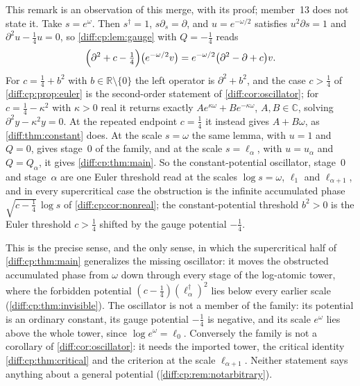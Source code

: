 \documentclass[11pt,letterpaper]{article}
\numberwithin{equation}{section}
\theoremstyle{definition}
\theoremstyle{remark}
\newcommand{\R}{\mathbb R}
\newcommand{\C}{\mathbb C}
\newcommand{\der}{\partial}
\begin{document}
\begin{remark}
\label{diff:cp:rem:oscillator}
This remark is an observation of this merge, with its proof; member~13 does
not state it. Take $s=e^{\omega}$. Then $s^{\dagger}=1$, $s\der_{s}=\der$, and
$u=e^{-\omega/2}$ satisfies $u^{2}\der s=1$ and $\der^{2}u-\frac14u=0$, so
\cref{diff:cp:lem:gauge} with $Q=-\frac14$ reads
\[
 \Bigl(\der^{2}+c-\tfrac14\Bigr)\bigl(e^{-\omega/2}v\bigr)
 =e^{-\omega/2}\bigl(\der^{2}-\der+c\bigr)v .
\]
For $c=\frac14+b^{2}$ with $b\in\R\setminus\{0\}$ the left operator is
$\der^{2}+b^{2}$, and the case $c>\frac14$ of \cref{diff:cp:prop:euler} is the
second-order statement of \cref{diff:cor:oscillator}; for $c=\frac14-\kappa^{2}$
with $\kappa>0$ real it returns exactly
$Ae^{\kappa\omega}+Be^{-\kappa\omega}$, $A,B\in\C$, solving
$\der^{2}y-\kappa^{2}y=0$. At the repeated endpoint
$c=\frac14$ it instead gives $A+B\omega$, as
\cref{diff:thm:constant} does. At the scale $s=\omega$ the same lemma, with
$u=1$ and $Q=0$, gives stage~$0$ of the family, and at the scale
$s=\ell_{\alpha}$, with $u=u_{\alpha}$ and $Q=Q_{\alpha}$, it gives
\cref{diff:cp:thm:main}. So the constant-potential oscillator, stage~$0$ and
stage~$\alpha$ are one Euler threshold read at the scales
$\log s=\omega$, $\ell_{1}$ and $\ell_{\alpha+1}$, and in every
supercritical case the obstruction is the infinite accumulated phase
$\sqrt{c-\frac14}\,\log s$ of \cref{diff:cp:cor:nonreal}; the constant-potential
threshold $b^{2}>0$ is the Euler threshold $c>\frac14$ shifted by the gauge
potential $-\frac14$.

This is the precise sense, and the only sense, in which the supercritical half
of \cref{diff:cp:thm:main} generalizes the missing oscillator: it moves the
obstructed accumulated phase from $\omega$ down through every stage of the
log-atomic tower, where the forbidden potential
$(c-\frac14)(\ell_{\alpha}^{\dagger})^{2}$ lies below every earlier scale
(\cref{diff:cp:thm:invisible}). The oscillator is not a member of the family:
its potential is an ordinary constant, its gauge potential $-\frac14$ is
negative, and its scale $e^{\omega}$ lies above the whole tower, since
$\log e^{\omega}=\ell_{0}$. Conversely the family is not a corollary of
\cref{diff:cor:oscillator}: it needs the imported tower, the critical identity
\cref{diff:cp:thm:critical} and the criterion at the scale $\ell_{\alpha+1}$.
Neither statement says anything about a general potential
(\cref{diff:cp:rem:notarbitrary}).
\end{remark}
\end{document}
